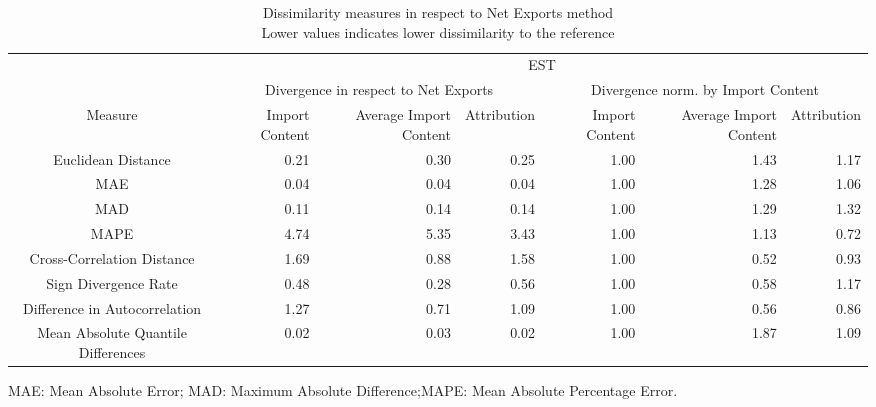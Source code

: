 \begin{table}[t]
\caption*{
{\large Dissimilarity measures in respect to Net Exports method} \\ 
{\small Lower values indicates lower dissimilarity to the reference}
} 
\fontsize{15.0pt}{18.0pt}\selectfont
\begin{tabular*}{\linewidth}{@{\extracolsep{\fill}}crrrrrr}
\toprule
 & \multicolumn{6}{c}{EST} \\ 
\cmidrule(lr){2-7}
 & \multicolumn{3}{c}{Divergence in respect to Net Exports} & \multicolumn{3}{c}{Divergence norm. by Import Content} \\ 
\cmidrule(lr){2-4} \cmidrule(lr){5-7}
Measure & Import Content & Average Import Content & Attribution & Import Content & Average Import Content & Attribution \\ 
\midrule\addlinespace[2.5pt]
Euclidean Distance & 0.21 & 0.30 & 0.25 & 1.00 & 1.43 & 1.17 \\ 
MAE & 0.04 & 0.04 & 0.04 & 1.00 & 1.28 & 1.06 \\ 
MAD & 0.11 & 0.14 & 0.14 & 1.00 & 1.29 & 1.32 \\ 
MAPE & 4.74 & 5.35 & 3.43 & 1.00 & 1.13 & 0.72 \\ 
Cross-Correlation Distance & 1.69 & 0.88 & 1.58 & 1.00 & 0.52 & 0.93 \\ 
Sign Divergence Rate & 0.48 & 0.28 & 0.56 & 1.00 & 0.58 & 1.17 \\ 
Difference in Autocorrelation & 1.27 & 0.71 & 1.09 & 1.00 & 0.56 & 0.86 \\ 
Mean Absolute Quantile Differences & 0.02 & 0.03 & 0.02 & 1.00 & 1.87 & 1.09 \\ 
\bottomrule
\end{tabular*}
\begin{minipage}{\linewidth}
MAE: Mean Absolute Error; MAD: Maximum Absolute Difference;MAPE: Mean Absolute Percentage Error.\\
\end{minipage}
\end{table}

